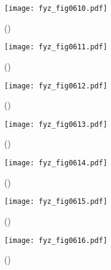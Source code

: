     \begin{figure}[ht!] %
      \centering
      \texttt{[image: fyz\_fig0610.pdf]}
      \caption{
               (\cite[s.~707]{Feynman02})}
      \label{fyz:fig0610}
    \end{figure}

    \begin{figure}[ht!] %
      \centering
      \texttt{[image: fyz\_fig0611.pdf]}
      \caption{
               (\cite[s.~707]{Feynman02})}
      \label{fyz:fig0611}
    \end{figure}

    \begin{figure}[ht!] %
      \centering
      \texttt{[image: fyz\_fig0612.pdf]}
      \caption{
               (\cite[s.~707]{Feynman02})}
      \label{fyz:fig0612}
    \end{figure}

    \begin{figure}[ht!] %
      \centering
      \texttt{[image: fyz\_fig0613.pdf]}
      \caption{
               (\cite[s.~707]{Feynman02})}
      \label{fyz:fig0613}
    \end{figure}

    \begin{figure}[ht!] %
      \centering
      \texttt{[image: fyz\_fig0614.pdf]}
      \caption{
               (\cite[s.~707]{Feynman02})}
      \label{fyz:fig0614}
    \end{figure}

    \begin{figure}[ht!] %
      \centering
      \texttt{[image: fyz\_fig0615.pdf]}
      \caption{
               (\cite[s.~707]{Feynman02})}
      \label{fyz:fig0615}
    \end{figure}

    \begin{figure}[ht!] %
      \centering
      \texttt{[image: fyz\_fig0616.pdf]}
      \caption{
               (\cite[s.~707]{Feynman02})}
      \label{fyz:fig0616}
    \end{figure}

